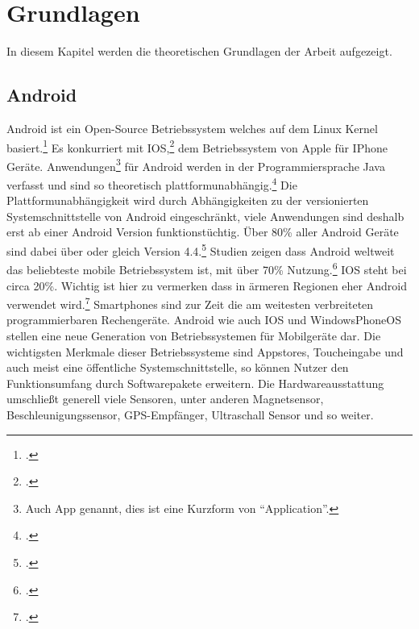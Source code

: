\section{Grundlagen}
	In diesem Kapitel werden die theoretischen Grundlagen der Arbeit aufgezeigt.
\subsection{Android}\label{ssec:android}
	Android ist ein Open-Source Betriebssystem welches auf dem Linux Kernel basiert.\footcite{android} Es konkurriert mit IOS,\footcite{ios} dem Betriebssystem von Apple für IPhone Geräte. Anwendungen\footnote{Auch App genannt, dies ist eine Kurzform von \enquote{Application}.} für Android werden in der Programmiersprache Java verfasst und sind so theoretisch plattformunabhängig.\footcite{java} Die Plattformunabhängigkeit wird durch Abhängigkeiten zu der versionierten Systemschnittstelle von Android eingeschränkt, viele Anwendungen sind deshalb erst ab einer Android Version funktionstüchtig. Über 80\% aller Android Geräte sind dabei über oder gleich Version 4.4.\footcite{android-fragmentation}
	Studien zeigen dass Android weltweit das beliebteste mobile Betriebssystem ist, mit über 70\% Nutzung.\footcite[\url{http://gs.statcounter.com/\#mobile_os-ww-monthly-200812-201701}]{android-stats} IOS steht bei circa 20\%. Wichtig ist hier zu vermerken dass in ärmeren Regionen eher Android verwendet wird.\footcite[\url{http://gs.statcounter.com/\#mobile_os-ww-monthly-201701-201701-map}]{android-stats} Smartphones sind zur Zeit die am weitesten verbreiteten programmierbaren Rechengeräte.
	Android wie auch IOS und WindowsPhoneOS stellen eine neue Generation von Betriebssystemen für Mobilgeräte dar. Die wichtigsten Merkmale dieser Betriebssysteme sind Appstores, Toucheingabe und auch meist eine öffentliche Systemschnittstelle, so können Nutzer den Funktionsumfang durch Softwarepakete erweitern.
	Die Hardwareausstattung umschließt generell viele Sensoren, unter anderen Magnetsensor, Beschleunigungssensor, GPS-Empfänger, Ultraschall Sensor und so weiter.
